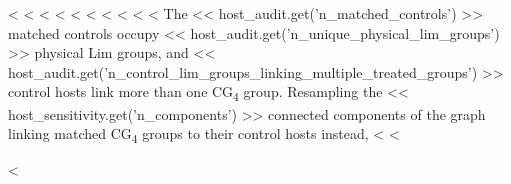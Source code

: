 \documentclass{aa}
\newcommand{\CG}{CG\textsubscript{4}}
\begin{document}
\begin{appendix}
<%
<%
<%
<%
<%
<%
<%
<%
<%
<%
The << host_audit.get('n_matched_controls') >> matched controls occupy << host_audit.get('n_unique_physical_lim_groups') >> physical Lim groups, and << host_audit.get('n_control_lim_groups_linking_multiple_treated_groups') >> control hosts link more than one \CG{} group. Resampling the << host_sensitivity.get('n_components') >> connected components of the graph linking matched \CG{} groups to their control hosts instead, <%
<%

<%


\end{appendix}
\end{document}
